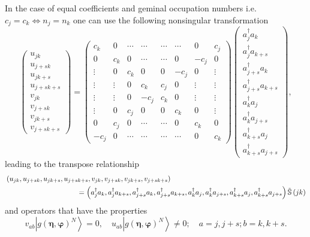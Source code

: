 \documentclass{preprint}
\begin{document}
In the case of equal coefficients and geminal occupation numbers i.e. $%
c_{j}=c_{k}\Leftrightarrow n_{j}=n_{k}$ one can use the following
nonsingular transformation
\begin{equation}
\left(
\begin{array}{c}
u_{jk} \\
u_{j+sk} \\
u_{jk+s} \\
u_{j+sk+s} \\
v_{jk} \\
v_{j+sk} \\
v_{jk+s} \\
v_{j+sk+s}%
\end{array}%
\right) =\left(
\begin{array}{cccccccc}
c_{k} & 0 & \cdots & \cdots & \cdots & \cdots & 0 & c_{j} \\
0 & c_{k} & 0 & \cdots & \cdots & 0 & -c_{j} & 0 \\
\vdots & 0 & c_{k} & 0 & 0 & -c_{j} & 0 & \vdots \\
\vdots & \vdots & 0 & c_{k} & c_{j} & 0 & \vdots & \vdots \\
\vdots & \vdots & 0 & -c_{j} & c_{k} & 0 & \vdots & \vdots \\
\vdots & 0 & c_{j} & 0 & 0 & c_{k} & 0 & \vdots \\
0 & c_{j} & 0 & \cdots & \cdots & 0 & c_{k} & 0 \\
-c_{j} & 0 & \cdots & \cdots & \cdots & \cdots & 0 & c_{k}%
\end{array}%
\right) \left(
\begin{array}{c}
a_{j}^{\dagger }a_{k} \\
a_{j}^{\dagger }a_{k+s} \\
a_{j+s}^{\dagger }a_{k} \\
a_{j+s}^{\dagger }a_{k+s} \\
a_{k}^{\dagger }a_{j} \\
a_{k}^{\dagger }a_{j+s} \\
a_{k+s}^{\dagger }a_{j} \\
a_{k+s}^{\dagger }a_{j+s}%
\end{array}%
\right) ,
\end{equation}%
leading to the transpose relationship
\begin{align}
& \left(
u_{jk},u_{j+sk},u_{jk+s},u_{j+sk+s},v_{jk},v_{j+sk},v_{jk+s},v_{j+sk+s}%
\right)  \notag \\
& \qquad \qquad \qquad \qquad \qquad \left. =\right. \left( a_{j}^{\dagger
}a_{k},a_{j}^{\dagger }a_{k+s},a_{j+s}^{\dagger }a_{k},a_{j+s}^{\dagger
}a_{k+s},a_{k}^{\dagger }a_{j},a_{k}^{\dagger }a_{j+s},a_{k+s}^{\dagger
}a_{j},a_{k+s}^{\dagger }a_{j+s}\right) \mathbb{\tilde{S}}\left( jk\right)
\end{align}%
and operators that have the properties
\begin{equation}
v_{ab}\left\vert g\left( \bm{\eta},\bm{\varphi}\right) ^{N}\right\rangle
=0,\quad u_{ab}\left\vert g\left( \bm{\eta },\bm{\varphi}\right)
^{N}\right\rangle \neq 0;\quad a=j,j+s;b=k,k+s.
\end{equation}
\end{document}
